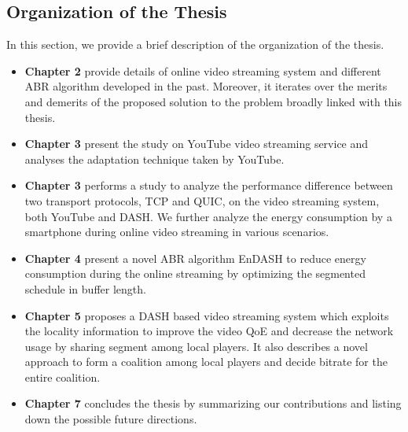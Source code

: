 \subsection{Organization of the Thesis}

In this section, we provide a brief description of the organization of the thesis.
\begin{itemize}
	\item {\bf Chapter 2} provide details of online video streaming system and different ABR algorithm developed in the past. Moreover, it iterates over the merits and demerits of the proposed solution to the problem broadly linked with this thesis.
	\item {\bf Chapter 3} present the study on YouTube video streaming service and analyses the adaptation technique taken by YouTube.
	\item {\bf Chapter 3} performs a study to analyze the performance difference between two transport protocols, TCP and QUIC, on the video streaming system, both YouTube and DASH. We further analyze the energy consumption by a smartphone during online video streaming in various scenarios.
	\item {\bf Chapter 4} present a novel ABR algorithm EnDASH to reduce energy consumption during the online streaming by optimizing the segmented schedule in buffer length.
	\item {\bf Chapter 5} proposes a DASH based video streaming system which exploits the locality information to improve the video QoE and decrease the network usage by sharing segment among local players. It also describes a novel approach to form a coalition among local players and decide bitrate for the entire coalition.
	\item {\bf Chapter 7} concludes the thesis by summarizing our contributions and listing down the possible future directions.
\end{itemize}
